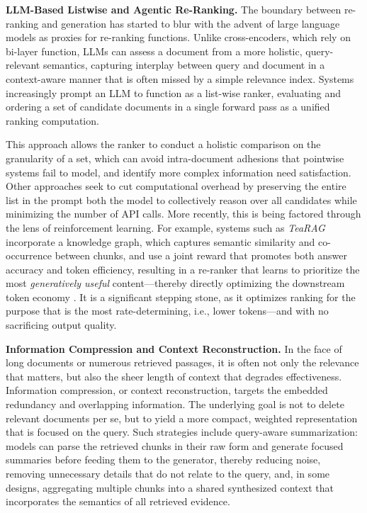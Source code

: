 \documentclass[11pt,a4paper]{article}
\begin{document}
\textbf{LLM-Based Listwise and Agentic Re-Ranking.} The boundary between re-ranking and generation has started to blur with the advent of large language models as proxies for re-ranking functions. Unlike cross-encoders, which rely on bi-layer function, LLMs can assess a document from a more holistic, query-relevant semantics, capturing interplay between query and document in a context-aware manner that is often missed by a simple relevance index. Systems increasingly prompt an LLM to function as a list-wise ranker, evaluating and ordering a set of candidate documents in a single forward pass as a unified ranking computation.

This approach allows the ranker to conduct a holistic comparison on the granularity of a set, which can avoid intra-document adhesions that pointwise systems fail to model, and identify more complex information need satisfaction. Other approaches seek to cut computational overhead by preserving the entire list in the prompt both the model to collectively reason over all candidates while minimizing the number of API calls. More recently, this is being factored through the lens of reinforcement learning. For example, systems such as \emph{TeaRAG} incorporate a knowledge graph, which captures semantic similarity and co-occurrence between chunks, and use a joint reward that promotes both answer accuracy and token efficiency, resulting in a re-ranker that learns to prioritize the most \emph{generatively useful} content---thereby directly optimizing the downstream token economy \cite{arxiv:2511.05385v2}. It is a significant stepping stone, as it optimizes ranking for the purpose that is the most rate-determining, i.e., lower tokens---and with no sacrificing output quality.

\textbf{Information Compression and Context Reconstruction.} In the face of long documents or numerous retrieved passages, it is often not only the relevance that matters, but also the sheer length of context that degrades effectiveness. Information compression, or context reconstruction, targets the embedded redundancy and overlapping information. The underlying goal is not to delete relevant documents per se, but to yield a more compact, weighted representation that is focused on the query. Such strategies include query-aware summarization: models can parse the retrieved chunks in their raw form and generate focused summaries before feeding them to the generator, thereby reducing noise, removing unnecessary details that do not relate to the query, and, in some designs, aggregating multiple chunks into a shared synthesized context that incorporates the semantics of all retrieved evidence.
\end{document}
